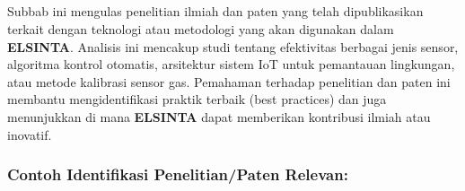 \documentclass{elsinta}
\begin{document}
\subsection{\RelResearchPatentsTitle}
Subbab ini mengulas penelitian ilmiah dan paten yang telah dipublikasikan terkait dengan teknologi atau metodologi yang akan digunakan dalam \textbf{ ELSINTA}. Analisis ini mencakup studi tentang efektivitas berbagai jenis sensor, algoritma kontrol otomatis, arsitektur sistem IoT untuk pemantauan lingkungan, atau metode kalibrasi sensor gas. Pemahaman terhadap penelitian dan paten ini membantu mengidentifikasi praktik terbaik (best practices) dan juga menunjukkan di mana \textbf{ ELSINTA} dapat memberikan kontribusi ilmiah atau inovatif.

\subsubsection*{Contoh Identifikasi Penelitian/Paten Relevan:}
\end{document}

